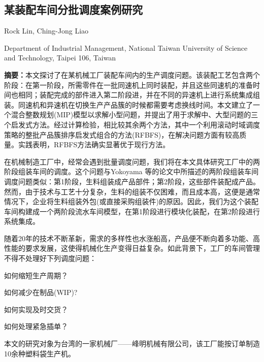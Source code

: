 \begin{Abstract}
\chapter*{某装配车间分批调度案例研究}
\begin{center}
\vspace{2mm}
{
 {\xiaosi Rock Lin, Ching-Jong Liao}

 {\xiaowu Department of Industrial Management, National Taiwan University of Science and Technology, Taipei 106, Taiwan}
}
\end{center}
{\wuhao \songti 
\noindent \textbf{摘要：}本文探讨了在某机械工厂装配车间内的生产调度问题。该装配工艺包含两个阶段：在第一阶段，所需零件在一批同速机上同时装配，并且这些同速机的准备时间也相同；装配完成的部件进入第二阶段进，并在不同的异速机上进行系统集成组装。同速机和异速机在切换生产产品簇的时候都需要考虑换线时间。本文建立了一个混合整数规划(MIP)模型以求解小型问题，并提出了用于求解中、大型问题的三个启发式方法。经过计算检验，相比较其余两个方法，其中一个利用滚动时域调度策略的整批产品簇排序启发式组合的方法(RFBFS)，在解决问题方面有较高质量。实践表明，RFBFS方法确实显著优于现行方法。

}
\end{Abstract}

在机械制造工厂中，经常会遇到批量调度问题，我们将在本文具体研究工厂中的两阶段组装车间的调度。这个问题与Yokoyama 等的论文中所描述的两阶段组装车间调度问题类似：第1阶段，生料组装成产品部件；第2阶段，这些部件装配成产品。然而，由于技术与工艺十分复杂，生料的组装不仅困难，而且成本高，这便是通常情况下，企业将生料组装外包(或直接采购组装件)的原因。因此，我们为这个装配车间构建成一个两阶段流水车间模型，在第1阶段进行模块化装配，在第2阶段进行系统集成。

随着20年的技术不断革新，需求的多样性也水涨船高，产品便不断向着多功能、高性能的要求发展，这使得机械化生产变得日益复杂。如此背景下，工厂的车间管理不得不处理好下列调度问题：
\begin{compactenum}[(1)]
\item 如何缩短生产周期？
\item 如何减少在制品(WIP)?
\item 如何实现及时交货？
\item 如何处理紧急插单？
\end{compactenum}

本文的研究对象为台湾的一家机械厂——峰明机械有限公司，该工厂能按订单制造10余种塑料袋生产机。



